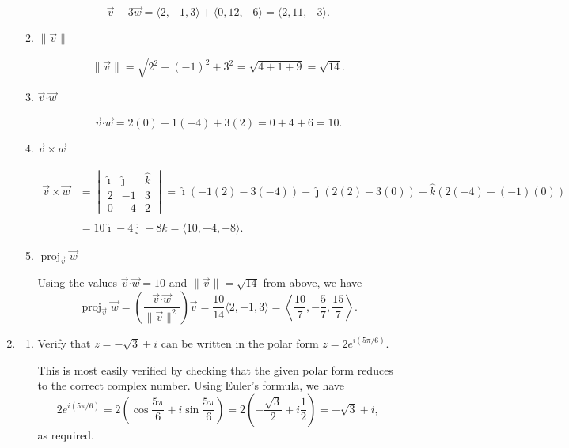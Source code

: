 \documentclass[12pt]{article}
\newcommand{\points}[1]{\marginpar{\hspace{24pt}[#1]}}
\newcommand{\dotp}{\boldsymbol{\cdot}}
\newcommand{\len}[1]{\lVert #1\rVert}
\begin{document}
\begin{enumerate}
\begin{enumerate}
\[
 \vec{v}-3\vec{w} = \langle 2,-1,3\rangle + \langle 0, 12, -6\rangle = \langle 2, 11, -3\rangle.
\]

  
 \item $\len{\vec{v}}$ \points{2}

\[
 \len{\vec{v}} = \sqrt{2^2+(-1)^2+3^2} = \sqrt{4+1+9} = \sqrt{14}.
\]


 \item $\vec{v}\dotp\vec{w}$ \points{2}

\[
 \vec{v}\dotp\vec{w} = 2(0)-1(-4)+3(2) = 0+4+6=10.
\]


 \item $\vec{v}\times \vec{w}$ \points{4}

\begin{align*}
 \vec{v}\times\vec{w} &= \begin{vmatrix}
                         \hat{\imath} & \hat{\jmath} & \hat{k}\\
			 2&-1&3\\0&-4&2
                        \end{vmatrix} = \hat{\imath}(-1(2)-3(-4))-\hat{\jmath}(2(2)-3(0))+\hat{k}(2(-4)-(-1)(0))\\
& = 10\hat{\imath}-4\hat{\jmath}-8\hat{k} = \langle 10,-4,-8\rangle.
\end{align*}


 \item $\operatorname{proj}_{\vec{v}}\vec{w}$ \points{4}

Using the values $\vec{v}\dotp\vec{w} = 10$ and $\len{\vec{v}} = \sqrt{14}$ from above, we have
\[
 \operatorname{proj}_{\vec{v}}\vec{w} = \left(\frac{\vec{v}\dotp\vec{w}}{\len{\vec{v}}^2}\right)\vec{v} = \frac{10}{14}\langle 2,-1,3\rangle = \left\langle \frac{10}{7},-\frac{5}{7},\frac{15}{7}\right\rangle.
\]

\end{enumerate}
\newpage

\item 
\begin{enumerate}
 \item Verify that $z=-\sqrt{3}+i$ can be written in the polar form $z=2e^{i(5\pi/6)}$. \points{3}

\bigskip

This is most easily verified by checking that the given polar form reduces to the correct complex number. Using Euler's formula, we have
\[
 2e^{i(5\pi/6)} = 2\left(\cos\frac{5\pi}{6}+i\sin\frac{5\pi}{6}\right) = 2\left(-\frac{\sqrt{3}}{2}+i\frac{1}{2}\right) = -\sqrt{3}+i,
\]
as required.


\end{enumerate}
\end{enumerate}
\end{document}
